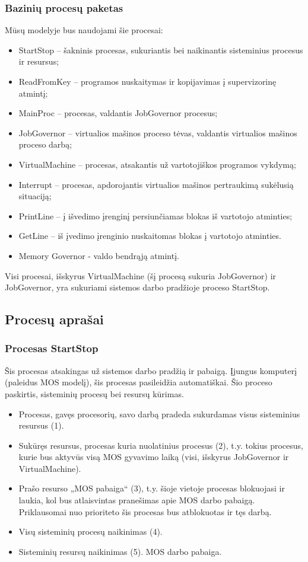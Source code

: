 \subsubsection{Bazinių procesų paketas}
Mūsų modelyje bus naudojami šie procesai:
	\begin{itemize}
		\item StartStop – šakninis procesas, sukuriantis bei naikinantis sisteminius procesus ir resursus;
		\item ReadFromKey – programos nuskaitymas ir kopijavimas į supervizorinę atmintį;
		\item MainProc – procesas, valdantis JobGovernor procesus;
		\item JobGovernor – virtualios mašinos proceso tėvas, valdantis virtualios mašinos proceso darbą;
		\item VirtualMachine – procesas, atsakantis už vartotojiškos programos vykdymą;
		\item Interrupt – procesas, apdorojantis virtualios mašinos pertraukimą sukėlusią situaciją;
		\item PrintLine – į išvedimo įrenginį persiunčiamas blokas iš vartotojo atminties;
		\item GetLine – iš įvedimo įrenginio nuskaitomas blokas į vartotojo atminties.
		\item Memory Governor - valdo bendrąją atmintį.
	\end{itemize}
Visi procesai, išskyrus VirtualMachine (šį procesą sukuria JobGovernor) ir JobGovernor, yra sukuriami sistemos darbo pradžioje proceso StartStop.

\subsection{Procesų aprašai}

\subsubsection{Procesas StartStop}
Šis procesas atsakingas už sistemos darbo pradžią ir pabaigą. Įjungus komputerį (paleidus MOS modelį), šis procesas pasileidžia automatiškai. Šio proceso paskirtis, sisteminių procesų bei resursų kūrimas.
	\begin{itemize}
		\item Procesas, gavęs procesorių, savo darbą pradeda sukurdamas visus sisteminius resursus (1). 
		\item Sukūręs resursus, procesas kuria nuolatinius procesus (2), t.y. tokius procesus, kurie bus aktyvūs visą MOS gyvavimo laiką (visi, išskyrus JobGovernor ir VirtualMachine).
		\item Prašo resurso „MOS pabaiga“ (3), t.y. šioje vietoje procesas blokuojasi ir laukia, kol bus atlaisvintas pranešimas apie MOS darbo pabaigą. Priklausomai nuo prioriteto šis procesas bus atblokuotas ir tęs darbą.
		\item Visų sisteminių procesų naikinimas (4). 
		\item Sisteminių resursų naikinimas (5). MOS darbo pabaiga.
	\end{itemize}
